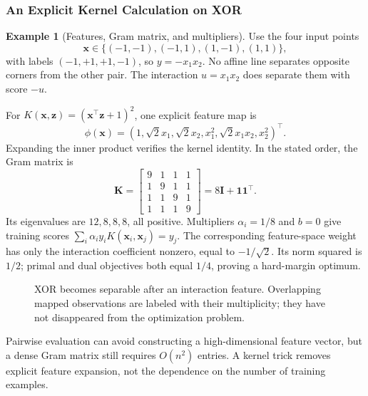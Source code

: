 \documentclass[11pt,twoside]{article}
\numberwithin{equation}{section}
\newcommand{\vect}[1]{\bm{#1}}
\newcommand{\mat}[1]{\bm{#1}}
\theoremstyle{plain}
\theoremstyle{definition}
\newtheorem{example}[theorem]{Example}
\theoremstyle{remark}
\begin{document}
\subsubsection{An Explicit Kernel Calculation on XOR}
\begin{example}[Features, Gram matrix, and multipliers]
Use the four input points
\[
\vect x\in\{(-1,-1),(-1,1),(1,-1),(1,1)\},
\]
with labels $(-1,+1,+1,-1)$, so $y=-x_1x_2$. No affine line separates opposite corners from the other pair. The interaction $u=x_1x_2$ does separate them with score $-u$.

For $K(\vect x,\vect z)=(\vect x^\top\vect z+1)^2$, one explicit feature map is
\[
\phi(\vect x)=(1,\sqrt2x_1,\sqrt2x_2,x_1^2,\sqrt2x_1x_2,x_2^2)^\top.
\]
Expanding the inner product verifies the kernel identity. In the stated order, the Gram matrix is
\[
\mat K=\begin{bmatrix}9&1&1&1\\1&9&1&1\\1&1&9&1\\1&1&1&9\end{bmatrix}=8\mat I+\vect1\vect1^\top.
\]
Its eigenvalues are $12,8,8,8$, all positive. Multipliers $\alpha_i=1/8$ and $b=0$ give training scores $\sum_i\alpha_i y_i K(\vect x_i,\vect x_j)=y_j$. The corresponding feature-space weight has only the interaction coefficient nonzero, equal to $-1/\sqrt2$. Its norm squared is $1/2$; primal and dual objectives both equal $1/4$, proving a hard-margin optimum.
\end{example}

\begin{figure}[H]
\centering
{}
\caption{XOR becomes separable after an interaction feature. Overlapping mapped observations are labeled with their multiplicity; they have not disappeared from the optimization problem.}
\end{figure}
Pairwise evaluation can avoid constructing a high-dimensional feature vector, but a dense Gram matrix still requires $O(n^2)$ entries. A kernel trick removes explicit feature expansion, not the dependence on the number of training examples.
\end{document}
